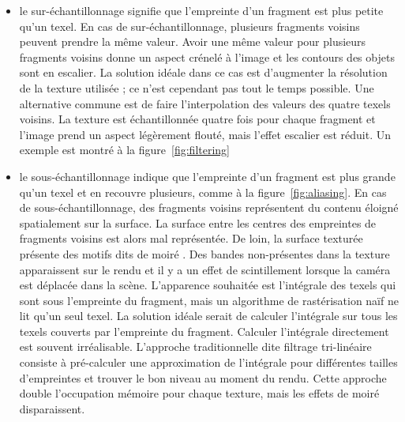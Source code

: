 \begin{itemize}
    \item le \og sur-échantillonnage \fg signifie que l'empreinte d'un fragment est plus petite qu'un texel. En cas de sur-échantillonnage, plusieurs fragments voisins peuvent prendre la même valeur. Avoir une même valeur pour plusieurs fragments voisins donne un aspect crénelé à l'image et les contours des objets sont en escalier. La solution idéale dans ce cas est d'augmenter la résolution de la texture utilisée ; ce n'est cependant pas tout le temps possible. Une alternative commune est de faire l'interpolation des valeurs des quatre texels voisins. La texture est échantillonnée quatre fois pour chaque fragment et l'image prend un aspect légèrement flouté, mais l'effet escalier est réduit. Un exemple est montré à la figure~\ref{fig:filtering}
    \item le \og sous-échantillonnage indique que l'empreinte d'un fragment est plus grande qu'un texel et en recouvre plusieurs, comme à la figure~\ref{fig:aliasing}. En cas de sous-échantillonnage, des fragments voisins représentent du contenu éloigné spatialement sur la surface. La surface entre les centres des empreintes de fragments voisins est alors mal représentée. De loin, la surface texturée présente des motifs dits de \og moiré \fg. Des bandes non-présentes dans la texture apparaissent sur le rendu et il y a un effet de scintillement lorsque la caméra est déplacée dans la scène. L'apparence souhaitée est l'intégrale des texels qui sont sous l'empreinte du fragment, mais un algorithme de rastérisation naïf ne lit qu'un seul texel. La solution idéale serait de calculer l'intégrale sur tous les texels couverts par l'empreinte du fragment. Calculer l'intégrale directement est souvent irréalisable. L'approche traditionnelle dite \og filtrage tri-linéaire \fg consiste à pré-calculer une approximation de l'intégrale pour différentes tailles d'empreintes et trouver le bon niveau au moment du rendu. Cette approche double l'occupation mémoire pour chaque texture, mais les effets de moiré disparaissent.

\end{itemize}

